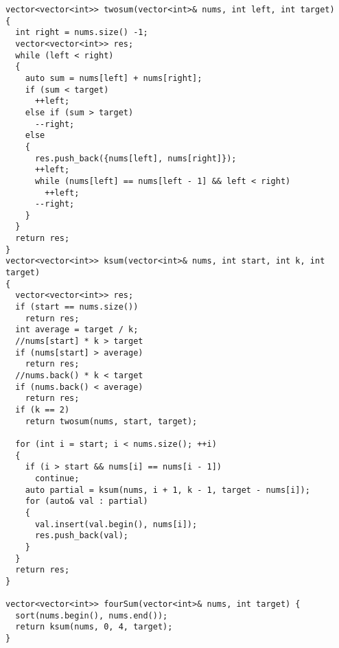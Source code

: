 \documentclass{book}
\begin{document}
	\begin{lstlisting}
vector<vector<int>> twosum(vector<int>& nums, int left, int target)
{
  int right = nums.size() -1;
  vector<vector<int>> res;
  while (left < right)
  {            
    auto sum = nums[left] + nums[right];
    if (sum < target)
      ++left;
    else if (sum > target)
      --right;
    else
    {
      res.push_back({nums[left], nums[right]});
      ++left;
      while (nums[left] == nums[left - 1] && left < right)
        ++left;
      --right;
    }
  }
  return res;
}
vector<vector<int>> ksum(vector<int>& nums, int start, int k, int target)
{
  vector<vector<int>> res;
  if (start == nums.size())
    return res;
  int average = target / k;
  //nums[start] * k > target
  if (nums[start] > average)
    return res;
  //nums.back() * k < target
  if (nums.back() < average)
    return res;
  if (k == 2)
    return twosum(nums, start, target);
  
  for (int i = start; i < nums.size(); ++i)
  {
    if (i > start && nums[i] == nums[i - 1])
      continue;
    auto partial = ksum(nums, i + 1, k - 1, target - nums[i]);
    for (auto& val : partial)
    {
      val.insert(val.begin(), nums[i]);
      res.push_back(val);
    }
  }
  return res;
}

vector<vector<int>> fourSum(vector<int>& nums, int target) {
  sort(nums.begin(), nums.end());
  return ksum(nums, 0, 4, target);
}
	\end{lstlisting}
\end{document}
